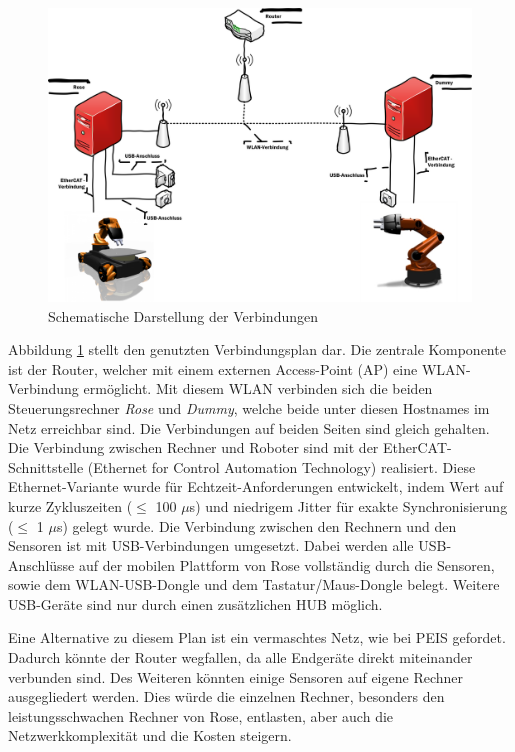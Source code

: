 \begin{figure}[H]
	\centering
	\includegraphics[scale=0.5]{fig/netw}   
	\caption[Schematische Darstellung der Verbindungen]{Schematische Darstellung der Verbindungen}
	\label{fig:aufbau-netw}
\end{figure}

Abbildung \ref{fig:aufbau-netw} stellt den genutzten Verbindungsplan dar. Die zentrale Komponente ist der Router, welcher mit einem externen Access-Point (AP) eine WLAN-Verbindung ermöglicht. Mit diesem WLAN verbinden sich die beiden Steuerungsrechner \textit{Rose} und \textit{Dummy}, welche beide unter diesen Hostnames im Netz erreichbar sind. Die Verbindungen auf beiden Seiten sind gleich gehalten. Die Verbindung zwischen Rechner und Roboter sind mit der EtherCAT-Schnittstelle (Ethernet for Control Automation Technology) realisiert. Diese Ethernet-Variante wurde für Echtzeit-Anforderungen entwickelt, indem Wert auf kurze Zykluszeiten ($\leq$ 100 $\mu$s) und  niedrigem Jitter für exakte Synchronisierung ($\leq$ 1 $\mu$s) gelegt wurde.\cite{ethercat} Die Verbindung zwischen den Rechnern und den Sensoren ist mit USB-Verbindungen umgesetzt. Dabei werden alle USB-Anschlüsse auf der mobilen Plattform von Rose vollständig durch die Sensoren, sowie dem WLAN-USB-Dongle und dem Tastatur/Maus-Dongle belegt. Weitere USB-Geräte sind nur durch einen zusätzlichen HUB möglich. 

Eine Alternative zu diesem Plan ist ein vermaschtes Netz, wie bei PEIS gefordet. Dadurch könnte der Router wegfallen, da alle Endgeräte direkt miteinander verbunden sind. Des Weiteren könnten einige Sensoren auf eigene Rechner ausgegliedert werden. Dies würde die einzelnen Rechner, besonders den leistungsschwachen Rechner von Rose, entlasten, aber auch die Netzwerkkomplexität und die Kosten steigern.

